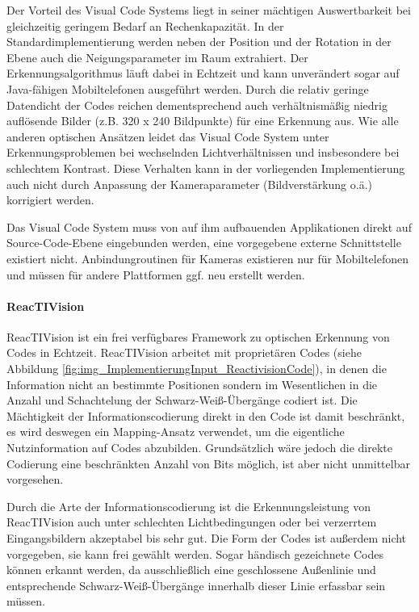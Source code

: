 Der Vorteil des Visual Code Systems liegt in seiner mächtigen Auswertbarkeit bei gleichzeitig geringem Bedarf an Rechenkapazität. In der Standardimplementierung werden neben der Position und der Rotation in der Ebene auch die Neigungsparameter im Raum extrahiert. Der Erkennungsalgorithmus läuft dabei in Echtzeit und kann unverändert sogar auf Java-fähigen Mobiltelefonen ausgeführt werden. Durch die relativ geringe Datendicht der Codes reichen dementsprechend auch verhältnismäßig niedrig auflösende Bilder (z.B. 320 x 240 Bildpunkte) für eine Erkennung aus. Wie alle anderen optischen Ansätzen leidet das Visual Code System unter Erkennungsproblemen bei wechselnden Lichtverhältnissen und insbesondere bei schlechtem Kontrast. Diese Verhalten kann in der vorliegenden Implementierung auch nicht durch Anpassung der Kameraparameter (Bildverstärkung o.ä.) korrigiert werden.

Das Visual Code System muss von auf ihm aufbauenden Applikationen direkt auf Source-Code-Ebene eingebunden werden, eine vorgegebene externe Schnittstelle existiert nicht. Anbindungroutinen für Kameras existieren nur für Mobiltelefonen und müssen für andere Plattformen ggf. neu erstellt werden.


\paragraph{ReacTIVision}\label{par:reactivision}
ReacTIVision \citep{Kaltenbrunner07} ist ein frei verfügbares Framework zu optischen Erkennung von Codes in Echtzeit. ReacTIVision arbeitet mit proprietären Codes (siehe Abbildung \ref{fig:img_ImplementierungInput_ReactivisionCode}), in denen die Information nicht an bestimmte Positionen sondern im Wesentlichen in die Anzahl und Schachtelung der Schwarz-Weiß-Übergänge codiert ist. Die Mächtigkeit der Informationscodierung direkt in den Code ist damit beschränkt, es wird deswegen ein Mapping-Ansatz verwendet, um die eigentliche Nutzinformation auf Codes abzubilden. Grundsätzlich wäre jedoch die direkte Codierung eine beschränkten Anzahl von Bits möglich, ist aber nicht unmittelbar vorgesehen.

Durch die Arte der Informationscodierung ist die Erkennungsleistung von ReacTIVision auch unter schlechten Lichtbedingungen oder bei verzerrtem Eingangsbildern akzeptabel bis sehr gut. Die Form der Codes ist außerdem nicht vorgegeben, sie kann frei gewählt werden. Sogar händisch gezeichnete Codes können erkannt werden, da ausschließlich eine geschlossene Außenlinie und entsprechende Schwarz-Weiß-Übergänge innerhalb dieser Linie erfassbar sein müssen.

